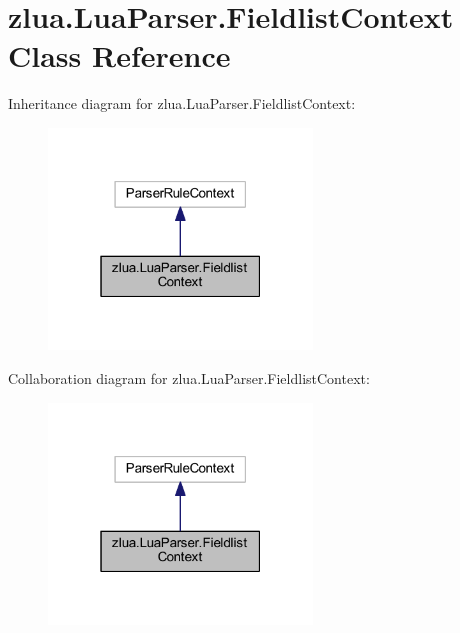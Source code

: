 \hypertarget{classzlua_1_1_lua_parser_1_1_fieldlist_context}{}\section{zlua.\+Lua\+Parser.\+Fieldlist\+Context Class Reference}
\label{classzlua_1_1_lua_parser_1_1_fieldlist_context}


Inheritance diagram for zlua.\+Lua\+Parser.\+Fieldlist\+Context\+:
\nopagebreak
\begin{figure}[H]
\begin{center}
\leavevmode
\includegraphics[width=199pt]{classzlua_1_1_lua_parser_1_1_fieldlist_context__inherit__graph}
\end{center}
\end{figure}


Collaboration diagram for zlua.\+Lua\+Parser.\+Fieldlist\+Context\+:
\nopagebreak
\begin{figure}[H]
\begin{center}
\leavevmode
\includegraphics[width=199pt]{classzlua_1_1_lua_parser_1_1_fieldlist_context__coll__graph}
\end{center}
\end{figure}
